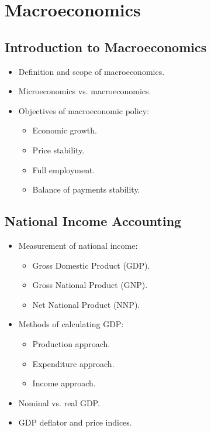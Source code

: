 \chapter{Macroeconomics}


\section{Introduction to Macroeconomics}
\begin{itemize}
    \item Definition and scope of macroeconomics.
    \item Microeconomics vs. macroeconomics.
    \item Objectives of macroeconomic policy:
    \begin{itemize}
        \item Economic growth.
        \item Price stability.
        \item Full employment.
        \item Balance of payments stability.
    \end{itemize}
\end{itemize}

\section{National Income Accounting}
\begin{itemize}
    \item Measurement of national income:
    \begin{itemize}
        \item Gross Domestic Product (GDP).
        \item Gross National Product (GNP).
        \item Net National Product (NNP).
    \end{itemize}
    \item Methods of calculating GDP:
    \begin{itemize}
        \item Production approach.
        \item Expenditure approach.
        \item Income approach.
    \end{itemize}
    \item Nominal vs. real GDP.
    \item GDP deflator and price indices.
\end{itemize}

